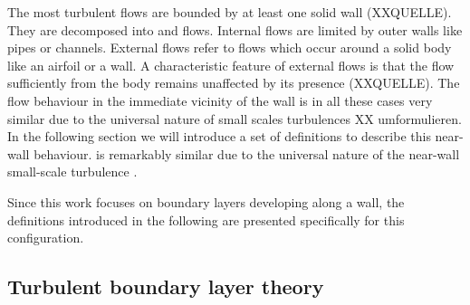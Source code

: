 The most turbulent flows are bounded by at least one solid wall (XXQUELLE).
They are decomposed into  and  flows. 
Internal flows are limited by outer walls like pipes or channels.
External flows refer to flows which occur around a solid body like an airfoil or a wall.
A characteristic feature of external flows is that the flow sufficiently from the body remains unaffected by its presence (XXQUELLE).
The flow behaviour in the immediate vicinity of the wall is in all these cases very similar due to the universal nature of small scales turbulences \citep{pope_turbulent_2015}XX umformulieren.
In the following section we will introduce a set of definitions to describe this near-wall behaviour.
is remarkably similar due to the universal nature of the near-wall small-scale turbulence \citep{pope_turbulent_2015}. 

Since this work focuses on boundary layers developing along a wall, the definitions introduced in the following are presented specifically for this configuration.

\subsection{Turbulent boundary layer theory} \label{subsec:TBLTheory}

